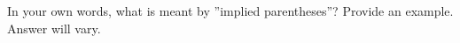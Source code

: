 {In your own words, what is meant by ''implied parentheses''? Provide an example.}
{Answer will vary.}

